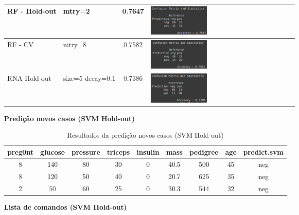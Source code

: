 \begin{longtable}{|>{\centering\arraybackslash}p{3cm}|>{\centering\arraybackslash}m{2.5cm}|c|m{7cm}|}
\hline
RF - Hold-out & mtry=2 & 0.7647 & \includegraphics[width=0.4\textwidth]{apendices/fig/8_IAA008_12.png} \\
\hline
RF - CV  & mtry=8 & 0.7582 & \includegraphics[width=0.4\textwidth]{apendices/fig/8_IAA008_13.png} \\
\hline
RNA Hold-out  & size=5 decay=0.1 & 0.7386 & \includegraphics[width=0.4\textwidth]{apendices/fig/8_IAA008_14.png} \\
\hline
\end{longtable}


\begin{center}
    \textbf{Predição novos casos (SVM Hold-out)}
\end{center}

\begin{table}[H]
\centering
\caption{Resultados da predição novos casos (SVM Hold-out)}
\begin{tabular}{|c|c|c|c|c|c|c|c|c|}
\hline
preg0nt & glucose & pressure & triceps & insulin & mass & pedigree & age & predict.svm \\
\hline
8 & 140 & 80 & 30 & 0 & 40.5 & 500 & 45 & neg \\
\hline
8 & 120 & 50 & 40 & 0 & 20.7 & 625 & 35 & neg \\
\hline
2 & 50  & 60 & 25 & 0 & 30.3 & 544 & 32 & neg \\
\hline
\end{tabular}
\end{table}

\begin{center}
    \textbf{Lista de comandos (SVM Hold-out)}
\end{center}

